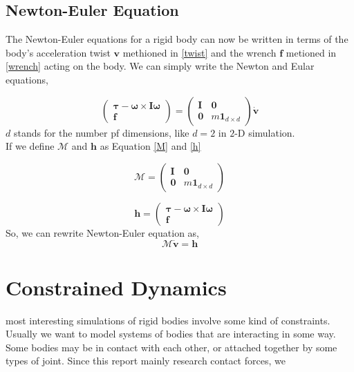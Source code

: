 \subsection{Newton-Euler Equation}
    The Newton-Euler equations for a rigid body can now be written in terms of the body's acceleration twist $\mathbf{v}$ methioned in \ref{twist} and the wrench $\mathbf{f}$ metioned in \ref{wrench} acting on the body. We can simply write the Newton and Eular equations,

    \begin{equation}
        \left( \begin{array}{c} \pmb{\tau} - \pmb{\omega} \times \pmb{I} \pmb{\omega}\\ \pmb{f} \end{array}\right) = \left( \begin{array}{cc} \pmb{I} & \pmb{0} \\ \pmb{0}& m\pmb{1}_{d\times d}\end{array} \right ) \dot{\mathbf{v}}
    \end{equation}
    $d$ stands for the number pf dimensions, like $d=2$ in $2$-D simulation. \\

    If we define $\mathcal{M}$ and $\mathbf{h}$ as Equation \ref{M} and \ref{h}

    \begin{equation}
        \mathcal{M} = \left( \begin{array}{cc} \pmb{I} & \pmb{0} \\ \pmb{0} & m\pmb{1}_{d \times d}\end{array} \right)
        \label{M}
    \end{equation}

    \begin{equation}
        \mathbf{h} = \left( \begin{array}{c} \pmb{\tau} - \pmb{\omega} \times \pmb{I} \pmb{\omega}\\ \pmb{f} \end{array}\right)
    \end{equation}
    So, we can rewrite Newton-Euler equation as,
    \begin{equation}
        \mathcal{M}\dot{\mathbf{v}} = \mathbf{h}
    \end{equation}


\section{Constrained Dynamics}
    most interesting simulations of rigid bodies involve some kind of constraints. Usually we want to model systems of bodies that are interacting in some way. Some bodies may be in contact with each other, or attached together by some types of joint. Since this report mainly research contact forces, we 
